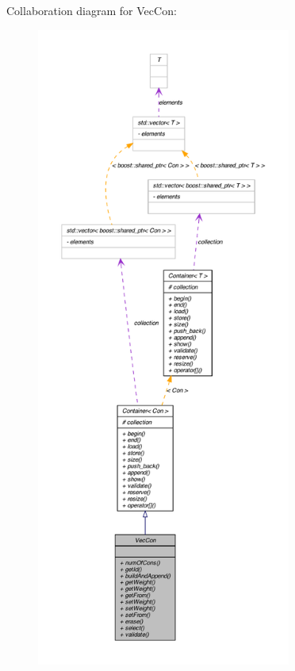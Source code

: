 Collaboration diagram for VecCon:\nopagebreak
\begin{figure}[H]
\begin{center}
\leavevmode
\includegraphics[height=600pt]{class_vec_con__coll__graph}
\end{center}
\end{figure}
